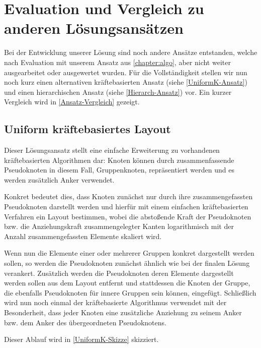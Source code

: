 \chapter{Evaluation und Vergleich zu anderen Lösungsansätzen}
\label{chapter:vgl}

Bei der Entwicklung unserer Lösung sind noch andere Ansätze entstanden, welche nach Evaluation mit unserem Ansatz aus \autoref{chapter:algo}, aber nicht weiter ausgearbeitet oder ausgewertet wurden. Für die Vollständigkeit stellen wir nun noch kurz einen alternativen kräftebasierten Ansatz (siehe \autoref{UniformK-Ansatz}) und einen hierarchischen Ansatz (siehe \autoref{Hierarch-Ansatz}) vor. Ein kurzer Vergleich wird in \autoref{Ansatz-Vergleich} gezeigt.

\section{Uniform kräftebasiertes Layout}
\label{UniformK-Ansatz}
Dieser Lösungsansatz stellt eine einfache Erweiterung zu vorhandenen kräftebasierten Algorithmen dar: Knoten können durch zusammenfassende Pseudoknoten in diesem Fall, Gruppenknoten, repräsentiert werden und es werden zusätzlich Anker verwendet.

Konkret bedeutet dies, dass Knoten zunächst nur durch ihre zusammengefassten Pseudoknoten darstellt werden und hierfür mit einem einfachen kräftebasierten Verfahren ein Layout bestimmen, wobei die abstoßende Kraft der Pseudoknoten bzw. die Anziehungskraft zusammengelegter Kanten logarithmisch mit der Anzahl zusammengefassten Elemente skaliert wird.

Wenn nun die Elemente einer oder mehrerer Gruppen konkret dargestellt werden sollen, so werden die Pseudoknoten zunächst ähnlich wie bei der finalen Lösung verankert. Zusätzlich werden die Pseudoknoten deren Elemente dargestellt werden sollen aus dem Layout entfernt und stattdessen die Knoten der Gruppe, die ebenfalls Pseudoknoten für innere Gruppen sein können, eingefügt. Schließlich wird nun noch einmal der kräftebasierte Algorithmus verwendet mit der Besonderheit, dass jeder Knoten eine zusätzliche Anziehung zu seinem Anker bzw. dem Anker des übergeordneten Pseudoknotens.

Dieser Ablauf wird in \autoref{UniformK-Skizze} skizziert.

